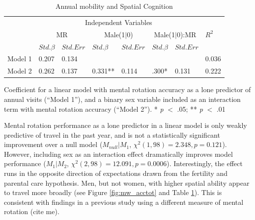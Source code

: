 \begin{table}[!tb]
\caption {Annual mobility and Spatial Cognition}
\label{tab:wm_spacemob}
  \centering
  \begin{tabular}{| l  ll  ll  ll  l |} 
    \hline   
  & \multicolumn{6}{c}{Independent Variables}& \\    
  & \multicolumn{2}{c}{MR} & \multicolumn{2}{c}{Male(1$|$0)} & \multicolumn{2}{c}{Male(1$|$0):MR} & $R^2$ \\
  & $Std. \beta$ & $Std. Err$ & $Std. \beta$ & $Std. Err$ & $Std. \beta$ & $Std. Err$  & \\
  Model 1 & 0.207\phantom{**} & 0.134\phantom{**} & & & & & 0.036\phantom{**} \\
  Model 2 & 0.262 & 0.137\phantom{**} & 0.331** & 0.114\phantom{**} & .300* & 0.131\phantom{**} & 0.222\\
  \hline 
  \end{tabular}  
{Coefficient for a linear model with mental rotation accuracy as a lone predictor of annual visits (``Model 1''), and a binary sex variable included as an interaction term with mental rotation accuracy (``Model 2'').  * \emph{p} $<$ .05; ** \emph{p} $<$  .01 }
\end{table}

Mental rotation performance as a lone predictor in a linear model is only weakly predictive of travel in the past year, and is not a statistically significant improvement over a null model ($M_{null} | M_1$, $\chi^2(1, 98) = 2.348, p = 0.121$).  However, including sex as an interaction effect dramatically improves model performance ($M_1 | M_2$, $\chi^2(2, 98) = 12.091, p = 0.0006$).  Interestingly, the effect runs in the opposite direction of expectations drawn from the fertility and parental care hypothesis.  Men, but not women, with higher spatial ability appear to travel more broadly (see Figure \ref{fig:mw_acctot} and Table \ref{tab:wm_spacemob}).  This is consistent with findings in a previous study using a different measure of mental rotation (cite me).

